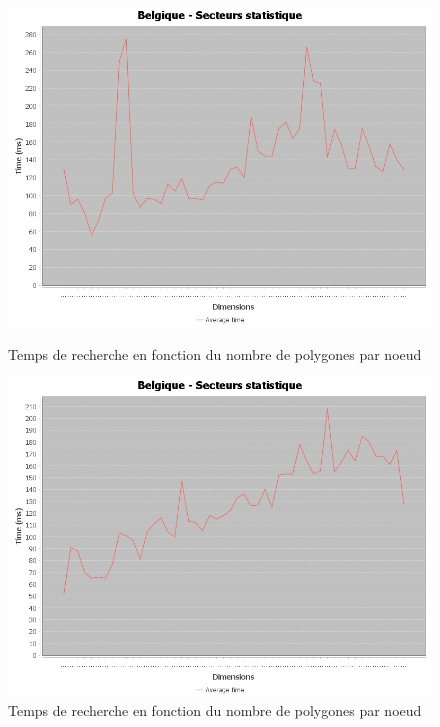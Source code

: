\documentclass {article}
\begin{document}
\begin{figure}[h]
    \begin{minipage}[t]{0.46\textwidth}
	\centering
	\includegraphics[width=\textwidth]{graph_lineaire_Belgique.png}
	\caption{Temps de recherche en fonction du nombre de polygones par noeud}
	\label{fig:belgique_stat_find_lin}
    \end{minipage}
    \begin{minipage}[t]{0.46\textwidth}
	\centering
	\includegraphics[width=\textwidth]{graph_quadratique_Belgique.png}
	\caption{Temps de recherche en fonction du nombre de polygones par noeud}
	\label{fig:belgique_stat_find_quad}
    \end{minipage}
\end{figure}
\end{document}
